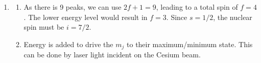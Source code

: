 \documentclass{homework}
\begin{document}
\begin{enumerate}
		\item \begin{enumerate}
			\item As there is 9 peaks, we can use $2f + 1 = 9$, leading to a total spin of $f=4$. The lower energy level would result in $f=3$. Since $s = 1/2$, the nuclear spin must be $i=7/2$.
			
			\item Energy is added to drive the $m_j$ to their maximum/minimum state. This can be done by laser light incident on the Cesium beam.
		\end{enumerate}
	
	\end{enumerate}
\end{document}
